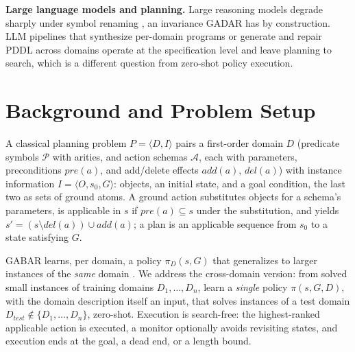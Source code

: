 \documentclass[letterpaper]{article} %
\newcommand{\gadar}{GADAR}                 %
\begin{document}
\textbf{Large language models and planning.} Large reasoning models degrade
sharply under symbol renaming \citep{llm_baseline}, an invariance \gadar{}
has by construction. LLM pipelines that synthesize per-domain programs or
generate and repair PDDL across domains \citep{halo_orchestrator} operate
at the specification level and leave planning to search, which is a
different question from zero-shot policy execution.

\section{Background and Problem Setup}

A classical planning problem $P = \langle D, I \rangle$ pairs a first-order
domain $D$ (predicate symbols $\mathcal{P}$ with arities, and action
schemas $\mathcal{A}$, each with parameters, preconditions $pre(a)$, and
add/delete effects $add(a)$, $del(a)$) with instance information
$I = \langle O, s_0, G \rangle$: objects, an initial state, and a goal
condition, the last two as sets of ground atoms. A ground action
substitutes objects for a schema's parameters, is applicable in $s$ if
$pre(a) \subseteq s$ under the substitution, and yields
$s' = (s \setminus del(a)) \cup add(a)$; a plan is an applicable sequence
from $s_0$ to a state satisfying $G$.

GABAR learns, per domain, a policy $\pi_D(s, G)$ that generalizes to larger
instances of the \emph{same} domain \citep{gabar}. We address the
cross-domain version: from solved small instances of training domains
$D_1, \dots, D_n$, learn a \emph{single} policy $\pi(s, G, D)$, with the
domain description itself an input, that solves instances of a test
domain $D_{\mathit{test}} \notin \{D_1, \dots, D_n\}$, zero-shot. Execution
is search-free: the highest-ranked applicable action is executed, a monitor optionally avoids revisiting states, and execution ends
at the goal, a dead end, or a length bound.
\end{document}
